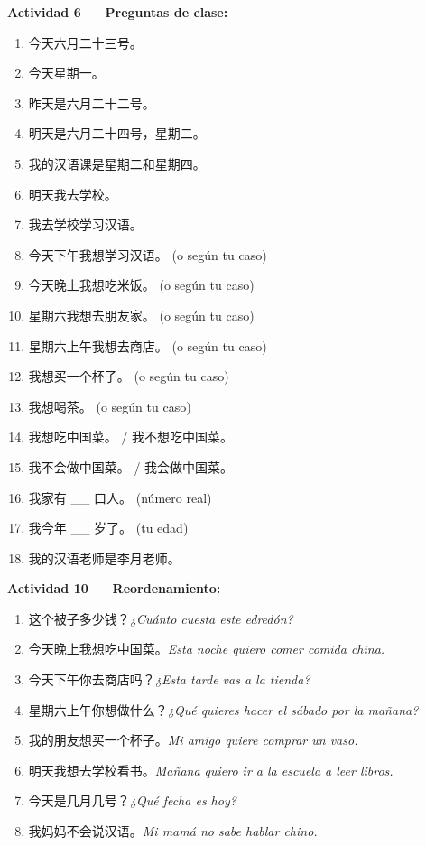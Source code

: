 \documentclass[12pt, a4paper]{article}
\begin{document}
\vspace{0.5em}
\textbf{Actividad 6 — Preguntas de clase:}
\begin{enumerate}[leftmargin=1.5cm]
\item 今天六月二十三号。
\item 今天星期一。
\item 昨天是六月二十二号。
\item 明天是六月二十四号，星期二。
\item 我的汉语课是星期二和星期四。
\item 明天我去学校。
\item 我去学校学习汉语。
\item 今天下午我想学习汉语。 (o según tu caso)
\item 今天晚上我想吃米饭。 (o según tu caso)
\item 星期六我想去朋友家。 (o según tu caso)
\item 星期六上午我想去商店。 (o según tu caso)
\item 我想买一个杯子。 (o según tu caso)
\item 我想喝茶。 (o según tu caso)
\item 我想吃中国菜。 / 我不想吃中国菜。
\item 我不会做中国菜。 / 我会做中国菜。
\item 我家有 \_\_ 口人。 (número real)
\item 我今年 \_\_ 岁了。 (tu edad)
\item 我的汉语老师是李月老师。
\end{enumerate}

\vspace{0.5em}
\textbf{Actividad 10 — Reordenamiento:}
\begin{enumerate}[leftmargin=1.5cm]
\item 这个被子多少钱？\quad \textit{¿Cuánto cuesta este edredón?}
\item 今天晚上我想吃中国菜。\quad \textit{Esta noche quiero comer comida china.}
\item 今天下午你去商店吗？\quad \textit{¿Esta tarde vas a la tienda?}
\item 星期六上午你想做什么？\quad \textit{¿Qué quieres hacer el sábado por la mañana?}
\item 我的朋友想买一个杯子。\quad \textit{Mi amigo quiere comprar un vaso.}
\item 明天我想去学校看书。\quad \textit{Mañana quiero ir a la escuela a leer libros.}
\item 今天是几月几号？\quad \textit{¿Qué fecha es hoy?}
\item 我妈妈不会说汉语。\quad \textit{Mi mamá no sabe hablar chino.}
\end{enumerate}
\end{document}
